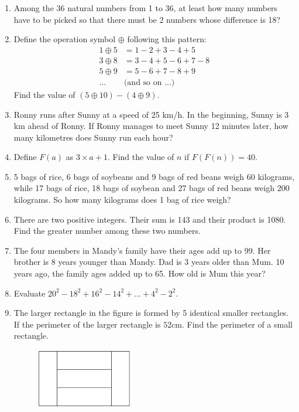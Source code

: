 \documentclass[11pt]{scrartcl}
\begin{document}
\begin{enumerate}
    \item Among the 36 natural numbers from 1 to 36, at least how many numbers have to be picked so that there must be 2 numbers whose difference is 18?
    
     \item Define the operation symbol $\oplus$ following this pattern:
    \begin{align*}
    1 \oplus 5 &= 1 - 2 + 3 - 4 + 5\\
    3 \oplus 8 &= 3 - 4 + 5 - 6 + 7 - 8\\
    5 \oplus 9 &= 5 - 6 + 7 - 8 + 9\\
    \dots& \text{(and so on ...)}
    \end{align*}
    Find the value of $(5 \oplus 10) - (4 \oplus 9).$
    
     \item Ronny runs after Sunny at a speed of 25 km/h. In the beginning, Sunny is 3 km ahead of Ronny. If Ronny manages to meet Sunny 12 minutes later, how many kilometres does Sunny run each hour?
    
     \item Define $F(a)$ as $3 \times a+1$. Find the value of $n$ if $F(F(n))=40$.
    
     \item 5 bags of rice, 6 bags of soybeans and 9 bags of red beans weigh 60 kilograms, while 17 bags of rice, 18 bags of soybean and 27 bags of red beans weigh 200 kilograms. So how many kilograms does 1 bag of rice weigh?
    
     \item There are two positive integers. Their sum is 143 and their product is 1080. Find the greater number among these two numbers.
    
     \item The four members in Mandy's family have their ages add up to 99. Her brother is 8 years younger than Mandy. Dad is 3 years older than Mum. 10 years ago, the family ages added up to 65. How old is Mum this year?
    
     \item Evaluate $20^2-18^2+16^2-14^2+\dots+4^2-2^2$.

    \item The larger rectangle in the figure is formed by 5 identical smaller rectangles. If the perimeter of the larger rectangle is $52$cm. Find the perimeter of a small rectangle. 
    \begin{figure}[h]
        \centering
        \includegraphics[width=0.4\textwidth]{StarGen/0Figure/5rect2.png}
    \end{figure}
    

\end{enumerate}
\end{document}
